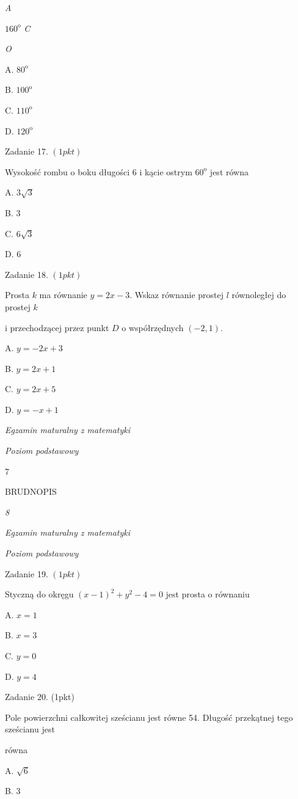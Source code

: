 \documentclass[a4paper,12pt]{article}
\begin{document}
{\it A}

$160^{\mathrm{o}}$  {\it C}

{\it O}

A. $80^{\mathrm{o}}$

B. $100^{\mathrm{o}}$

C. $110^{\mathrm{o}}$

D. $120^{\mathrm{o}}$

Zadanie 17. $(1pkt)$

Wysokość rombu o boku długości 6 i kącie ostrym $60^{\mathrm{o}}$ jest równa

A. $3\sqrt{3}$

B. 3

C. $6\sqrt{3}$

D. 6

Zadanie 18. $(1pkt)$

Prosta $k$ ma równanie $y=2x-3$. Wskaz równanie prostej $l$ równoległej do prostej $k$

i przechodzącej przez punkt $D$ o współrzędnych $(-2,1).$

A. $y=-2x+3$

B. $y=2x+1$

C. $y=2x+5$

D. $y=-x+1$





{\it Egzamin maturalny z matematyki}

{\it Poziom podstawowy}

7

BRUDNOPIS





{\it 8}

{\it Egzamin maturalny z matematyki}

{\it Poziom podstawowy}

Zadanie 19. $(1pkt)$

Styczną do okręgu $(x-1)^{2}+y^{2}-4=0$ jest prosta o równaniu

A. $x=1$

B. $x=3$

C. $y=0$

D. $y=4$

Zadanie 20. (1pkt)

Pole powierzchni całkowitej sześcianu jest równe 54. Długość przekątnej tego sześcianu jest

równa

A. $\sqrt{6}$

B. 3
\end{document}
